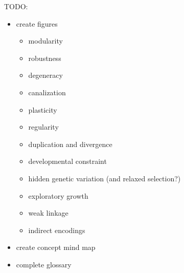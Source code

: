 TODO:
\begin{itemize}
  \item create figures
  \begin{itemize}
    \item modularity
    \item robustness
    \item degeneracy
    \item canalization
    \item plasticity
    \item regularity
    \item duplication and divergence
    \item developmental constraint
    \item hidden genetic variation (and relaxed selection?)
    \item exploratory growth
    \item weak linkage
    \item indirect encodings
  \end{itemize}
  \item create concept mind map
  \item complete glossary
\end{itemize}

\newpage